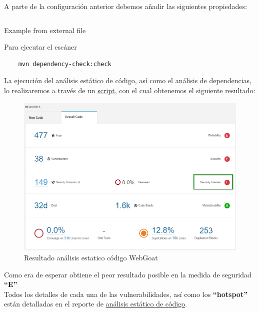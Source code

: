 A parte de la configuración anterior debemos añadir las siguientes propiedades:\\

\begin{listing}[h]
    \inputminted{xml}{./Ficheros/ConfigPropertiesPlugin_maven.xml}
    \caption{Example from external file}
    \label{listing:5}
\end{listing}

Para ejecutar el escáner\\

\begin{verbatim}
    mvn dependency-check:check
\end{verbatim}

\newpage
La ejecución del análisis estático de código, así como el análisis de dependencias, lo realizaremos a través de un 
\href{https://github.com/M0l1n3ta/PFG/blob/master/Scripts/STAT/RunSonarScaner_WebGoat.ps1}{script}, con el cual
obtenemos el siguiente resultado:\\

\begin{figure}[htb] 
    \captionsetup{width=1\linewidth}   
    \includegraphics[width=\linewidth]{./imagenes/09_AnalisisEstatico_WebGoat.png}
    \caption{Resultado análisis estatico código WebGoat}  
    \label{fig:25}
\end{figure}

Como era de esperar obtiene el peor resultado posible en la medida de seguridad \textbf{“E”}\\

Todos los detalles de cada una de las vulnerabilidades, así como los \textbf{“hotspot”} están detalladas en el reporte de 
\href{https://github.com/M0l1n3ta/PFG/blob/master/Reportes/An%C3%A1lisis estatico de c%C3%B3digo/ReporteAnalisisestatico_WebGoat.docx}{análisis estático de código}.

